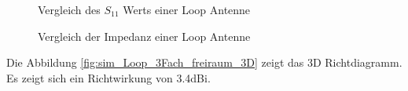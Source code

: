 \begin{figure}[!ht]
	\centering
	\begingroup
	
	\endgroup
	\caption{Vergleich des $S_{11}$ Werts einer Loop Antenne}
	\label{S11_Loop_Vergleich_Simulation}
\end{figure}
\begin{figure}[!ht]
	\centering
	\begingroup
	
	\endgroup
	\caption{Vergleich der Impedanz einer Loop Antenne}
	\label{Impedanz_Loop_Vergleich_Simulation}
\end{figure}


Die Abbildung \ref{fig:sim_Loop_3Fach_freiraum_3D} zeigt das 3D Richtdiagramm. Es zeigt sich ein Richtwirkung von 3.4dBi.
\newpage
\clearpage
